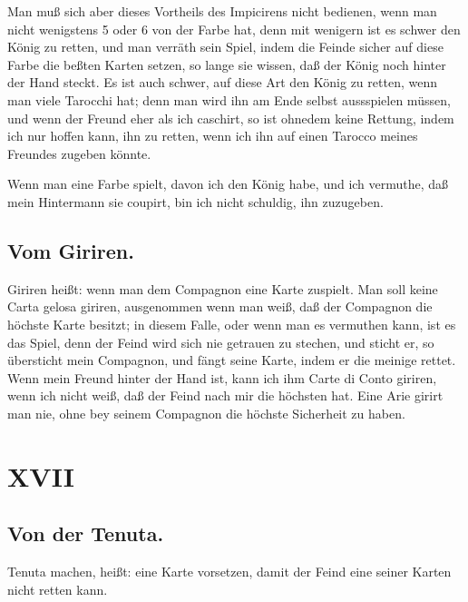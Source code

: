 \documentclass[11pt,a6paper,twoside]{article}
\begin{document}
Man muß sich aber dieses Vortheils des Impicirens nicht bedienen, wenn man nicht wenigstens 5 oder 6 von der Farbe hat, denn mit wenigern ist es schwer den König zu retten, und man verräth sein Spiel, indem die Feinde sicher auf diese Farbe die beßten Karten setzen, so lange sie wissen, daß der König noch hinter der Hand steckt. Es ist auch schwer, auf diese Art den König zu retten, wenn man viele Tarocchi hat; denn man wird ihn am Ende selbst aussspielen müssen, und wenn der Freund eher als ich caschirt, so ist ohnedem keine Rettung, indem ich nur hoffen kann, ihn zu retten, wenn ich ihn auf einen Tarocco meines Freundes zugeben könnte.

Wenn man eine Farbe spielt, davon ich den König habe, und ich vermuthe, daß mein Hintermann sie coupirt, bin ich nicht schuldig, ihn zuzugeben.

\subsection{Vom Giriren.}

Giriren heißt: wenn man dem Compagnon eine Karte zuspielt. Man soll keine Carta gelosa giriren, ausgenommen wenn man weiß, daß der Compagnon die höchste Karte besitzt; in diesem Falle, oder wenn man es vermuthen kann, ist es das Spiel, denn der Feind wird sich nie getrauen zu stechen, und sticht er, so übersticht mein Compagnon, und fängt seine Karte, indem er die meinige rettet. Wenn mein Freund hinter der Hand ist, kann ich ihm Carte di Conto giriren, wenn ich nicht weiß, daß der Feind nach mir die höchsten hat. Eine Arie girirt man nie, ohne bey seinem Compagnon die höchste Sicherheit zu haben.

\section{XVII}
\subsection{Von der Tenuta.}

Tenuta machen, heißt: eine Karte vorsetzen, damit der Feind eine seiner Karten nicht retten kann.
\end{document}
